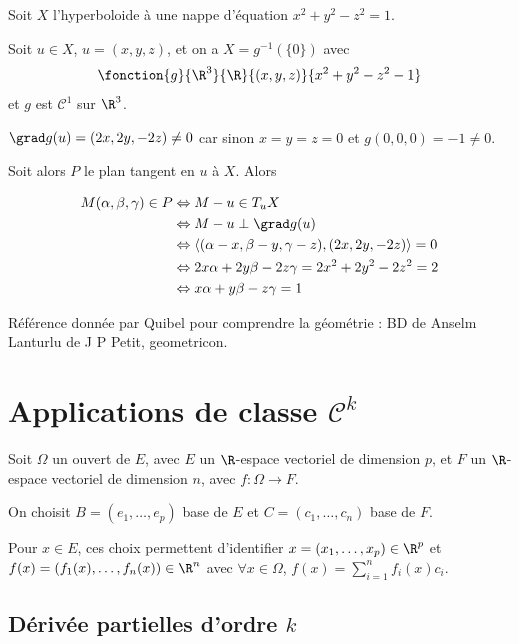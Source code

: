 \begin{exemple}
    Soit $X$ l'hyperboloide à une nappe d'équation $x^2 + y^2 - z^2 = 1$.

    Soit $u \in X$, $u = (x, y, z)$, et on a $X = g^{-1}(\{0\})$ avec 
    $$\fonction{g}{\R^3}{\R}{(x, y, z)}{x^2 + y^2 - z^2 - 1}$$
    et $g$ est $\mathscr C^1$ sur $\R^3$.

    $\grad g (u) = (2x, 2y, -2z) \neq 0$ car sinon $x = y = z = 0$ et $g(0, 0, 0) = -1 \neq 0$.

    Soit alors $P$ le plan tangent en $u$ à $X$. Alors 

    \begin{align}
        M(\alpha, \beta, \gamma) \in P & \Leftrightarrow M - u \in T_uX \\
        & \Leftrightarrow M - u \perp \grad g(u) \\
        & \Leftrightarrow \langle (\alpha - x, \beta - y, \gamma - z), (2x, 2y, -2z) \rangle = 0 \\
        & \Leftrightarrow 2x \alpha + 2y \beta - 2z \gamma = 2x^2 + 2y^2 - 2z^2 = 2 \\
        & \Leftrightarrow x \alpha + y \beta - z \gamma = 1
    \end{align}
\end{exemple}

Référence donnée par Quibel pour comprendre la géométrie : BD de Anselm Lanturlu de J P Petit, geometricon. 

\section{Applications de classe \texorpdfstring{$\mathscr C^k $}{Ck}} 

Soit $\Omega$ un ouvert de $E$, avec $E$ un $\R$-espace vectoriel de dimension $p$, 
et $F$ un $\R$-espace vectoriel de dimension $n$, avec $f : \Omega \to F$.

On choisit $B = (e_1, \ldots, e_p)$ base de $E$ et $C = (c_1, \ldots, c_n)$ base de $F$.

Pour $x \in E$, ces choix permettent d'identifier $x = (x_1, \ldots, x_p) \in \R^p$
et $f(x) = (f_1(x), \ldots, f_n(x)) \in \R^n$ avec $\forall x \in \Omega$, 
$f(x) = \sum_{i=1}^n f_i(x) c_i$.

\subsection{Dérivée partielles d'ordre \texorpdfstring{$k$}{k}}

